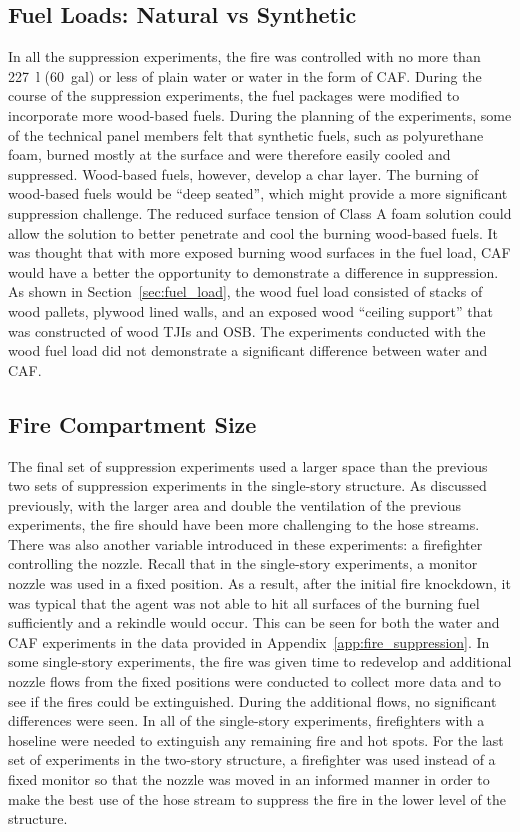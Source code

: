 \documentclass[12pt,oneside]{book}
\begin{document}
\subsection{Fuel Loads: Natural vs Synthetic}
In all the suppression experiments, the fire was controlled with no more than 227~l (60~gal) or less of plain water or water in the form of CAF. During the course of the suppression experiments, the fuel packages were modified to incorporate more wood-based fuels. During the planning of the experiments, some of the technical panel members felt that synthetic fuels, such as polyurethane foam, burned mostly at the surface and were therefore easily cooled and suppressed. Wood-based fuels, however, develop a char layer. The burning of wood-based fuels would be ``deep seated'', which might provide a more significant suppression challenge. The reduced surface tension of Class A foam solution could allow the solution to better penetrate and cool the burning wood-based fuels. It was thought that with more exposed burning wood surfaces in the fuel load, CAF would have a better the opportunity to demonstrate a difference in suppression. As shown in Section~\ref{sec:fuel_load}, the wood fuel load consisted of stacks of wood pallets, plywood lined walls, and an exposed wood ``ceiling support'' that was constructed of wood TJIs and OSB. The experiments conducted with the wood fuel load did not demonstrate a significant difference between water and CAF.  

\subsection{Fire Compartment Size}
The final set of suppression experiments used a larger space than the previous two sets of suppression experiments in the single-story structure. As discussed previously, with the larger area and double the ventilation of the previous experiments, the fire should have been more challenging to the hose streams. There was also another variable introduced in these experiments: a firefighter controlling the nozzle. Recall that in the single-story experiments, a monitor nozzle was used in a fixed position. As a result, after the initial fire knockdown, it was typical that the agent was not able to hit all surfaces of the burning fuel sufficiently and a rekindle would occur. This can be seen for both the water and CAF experiments in the data provided in Appendix~\ref{app:fire_suppression}. In some single-story experiments, the fire was given time to redevelop and additional nozzle flows from the fixed positions were conducted to collect more data and to see if the fires could be extinguished. During the additional flows, no significant differences were seen. In all of the single-story experiments, firefighters with a hoseline were needed to extinguish any remaining fire and hot spots. For the last set of experiments in the two-story structure, a firefighter was used instead of a fixed monitor so that the nozzle was moved in an informed manner in order to make the best use of the hose stream to suppress the fire in the lower level of the structure.  
\end{document}
